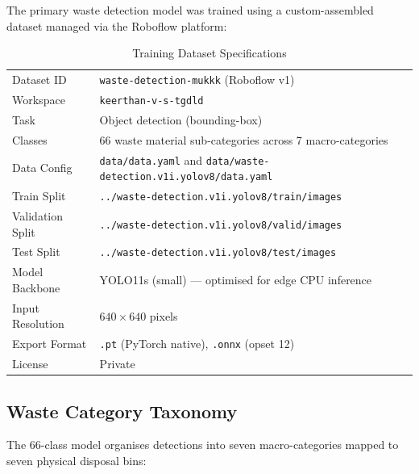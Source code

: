 \documentclass[12pt,a4paper]{article}
\begin{document}
The primary waste detection model was trained using a custom-assembled dataset managed
via the Roboflow platform:

\renewcommand{\arraystretch}{1.30}
\begin{table}[H]
\centering
\caption{Training Dataset Specifications}
\label{tab:dataset}
\small
\begin{tabularx}{\linewidth}{@{} L{3.8cm} X @{}}
\toprule
{} &  \\
\midrule
{}
Dataset ID       & \texttt{waste-detection-mukkk} (Roboflow v1) \\
Workspace        & \texttt{keerthan-v-s-tgdld} \\
Task             & Object detection (bounding-box) \\
Classes          & 66 waste material sub-categories across 7 macro-categories \\
Data Config      & \texttt{data/data.yaml} and \texttt{data/waste-detection.v1i.yolov8/data.yaml} \\
Train Split      & \texttt{../waste-detection.v1i.yolov8/train/images} \\
Validation Split & \texttt{../waste-detection.v1i.yolov8/valid/images} \\
Test Split       & \texttt{../waste-detection.v1i.yolov8/test/images} \\
Model Backbone   & YOLO11s (small) --- optimised for edge CPU inference \\
Input Resolution & $640 \times 640$ pixels \\
Export Format    & \texttt{.pt} (PyTorch native), \texttt{.onnx} (opset 12) \\
License          & Private \\
\bottomrule
\end{tabularx}
\end{table}

\subsection{Waste Category Taxonomy}

The 66-class model organises detections into seven macro-categories mapped to seven
physical disposal bins:
\end{document}
